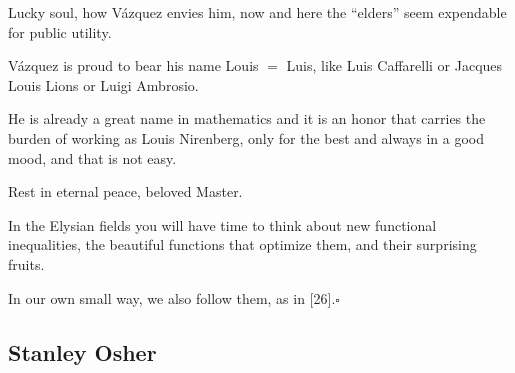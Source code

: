 \documentclass{article}
\begin{document}
Lucky soul, how V\'azquez envies him, now and here the ``elders'' seem expendable for public utility.

%
V\'azquez is proud to bear his name Louis $=$ Luis, like Luis Caffarelli or Jacques Louis Lions or Luigi Ambrosio.

He is already a great name in mathematics and it is an honor that carries the burden of working as Louis Nirenberg, only for the best and always in a good mood, and that is not easy.

Rest in eternal peace, beloved Master.

In the Elysian fields you will have time to think about new functional inequalities, the beautiful functions that optimize them, and their surprising fruits.

In our own small way, we also follow them, as in [26].\hfill$\square$



\subsection{Stanley Osher}


\end{document}
